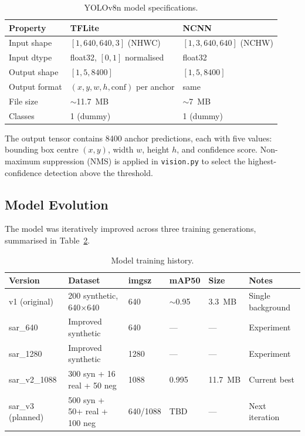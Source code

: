\begin{table}[htbp]
\centering
\caption{YOLOv8n model specifications.}
\label{tab:model-specs}
\begin{tabular}{lll}
\hline
\textbf{Property} & \textbf{TFLite} & \textbf{NCNN} \\
\hline
Input shape       & $[1, 640, 640, 3]$ (NHWC) & $[1, 3, 640, 640]$ (NCHW) \\
Input dtype       & float32, $[0, 1]$ normalised & float32 \\
Output shape      & $[1, 5, 8400]$ & $[1, 5, 8400]$ \\
Output format     & $(x, y, w, h, \text{conf})$ per anchor & same \\
File size          & $\sim$11.7~MB & $\sim$7~MB \\
Classes           & 1 (dummy) & 1 (dummy) \\
\hline
\end{tabular}
\end{table}

The output tensor contains 8400 anchor predictions, each with five values:
bounding box centre $(x, y)$, width $w$, height $h$, and confidence score.
Non-maximum suppression (NMS) is applied in \texttt{vision.py} to select the
highest-confidence detection above the threshold.

\subsection{Model Evolution}

The model was iteratively improved across three training generations, summarised
in Table~\ref{tab:model-history}.

\begin{table}[htbp]
\centering
\caption{Model training history.}
\label{tab:model-history}
\begin{tabular}{llllll}
\hline
\textbf{Version} & \textbf{Dataset} & \textbf{imgsz} & \textbf{mAP50} & \textbf{Size} & \textbf{Notes} \\
\hline
v1 (original) & 200 synthetic, 640$\times$640 & 640 & $\sim$0.95 & 3.3~MB & Single background \\
sar\_640       & Improved synthetic & 640 & --- & --- & Experiment \\
sar\_1280      & Improved synthetic & 1280 & --- & --- & Experiment \\
sar\_v2\_1088  & 300 syn + 16 real + 50 neg & 1088 & 0.995 & 11.7~MB & Current best \\
sar\_v3 (planned) & 500 syn + 50+ real + 100 neg & 640/1088 & TBD & --- & Next iteration \\
\hline
\end{tabular}
\end{table}

